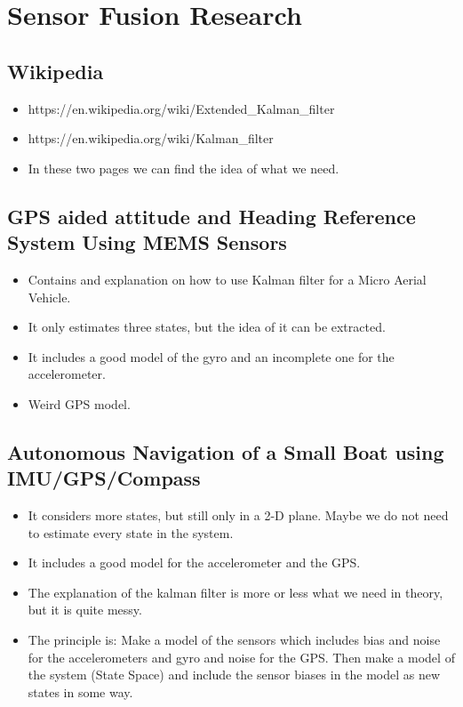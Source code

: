 
\renewcommand{\vec}[1]{\boldsymbol{\mathbf{#1}}}

\renewcommand\chaptername{KAPITEL}
\renewcommand\contentsname{Indhold}
\renewcommand\figurename{Figur}
\renewcommand\tablename{Tabel}

\section*{Sensor Fusion Research}
\subsection{Wikipedia}
\begin{itemize}
	\item https://en.wikipedia.org/wiki/Extended\_Kalman\_filter
	\item https://en.wikipedia.org/wiki/Kalman\_filter
	\item In these two pages we can find the idea of what we need.
\end{itemize}
\subsection{GPS aided attitude and Heading Reference System Using MEMS Sensors}
\begin{itemize}
	\item Contains and explanation on how to use Kalman filter for a Micro Aerial Vehicle.
	\item It only estimates three states, but the idea of it can be extracted. 
	\item It includes a good model of the gyro and an incomplete one for the accelerometer.
	\item Weird GPS model.
\end{itemize}	
\subsection{Autonomous Navigation of a Small Boat using IMU/GPS/Compass}
\begin{itemize}
	\item It considers more states, but still only in a 2-D plane. Maybe we do not need to estimate every state in the system.
	\item It includes a good model for the accelerometer and the GPS.
	\item The explanation of the kalman filter is more or less what we need in theory, but it is quite messy.
	\item The principle is: Make a model of the sensors which includes bias and noise for the accelerometers and gyro and noise for the GPS. Then make a model of the system (State Space) and include the sensor biases in the model as new states in some way.   
\end{itemize}
